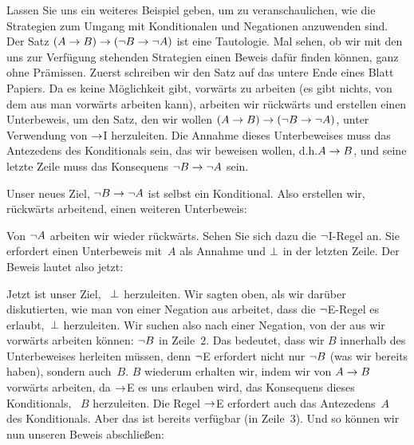 Lassen Sie uns ein weiteres Beispiel geben, um zu veranschaulichen, wie die Strategien zum Umgang mit Konditionalen und Negationen anzuwenden sind. Der Satz $(A \rightarrow B) \rightarrow (\neg B \rightarrow \neg A)$ ist eine Tautologie. Mal sehen, ob wir mit den uns zur Verfügung stehenden Strategien einen Beweis dafür finden können, ganz ohne Prämissen. Zuerst schreiben wir den Satz auf das untere Ende eines Blatt Papiers. Da es keine Möglichkeit gibt, vorwärts zu arbeiten (es gibt nichts, von dem aus man vorwärts arbeiten kann), arbeiten wir rückwärts und erstellen einen Unterbeweis, um den Satz, den wir wollen $(A \rightarrow B) \rightarrow (\neg B \rightarrow \neg A)$, unter Verwendung von $\rightarrow$I herzuleiten. Die Annahme dieses Unterbeweises muss das Antezedens des Konditionals sein, das wir beweisen wollen, d.h.\@ $A \rightarrow B$, und seine letzte Zeile muss das Konsequens $\neg B \rightarrow \neg A$ sein.
\begin{fitchproof}
\open
{}
\ellipsesline
{}
\close
{}
\end{fitchproof}
Unser neues Ziel, $\neg B \rightarrow \neg A$ ist selbst ein Konditional. Also erstellen wir, rückwärts arbeitend, einen weiteren Unterbeweis:
\begin{fitchproof}
	\open
	\open
	\ellipsesline
	\close
	\close
\end{fitchproof}
Von $\neg A$ arbeiten wir wieder rückwärts. Sehen Sie sich dazu die $\neg$I-Regel an. Sie erfordert einen Unterbeweis mit~$A$ als Annahme und $\bot$ in der letzten Zeile. Der Beweis lautet also jetzt:
\begin{fitchproof}
	\open
	\open
	\open{}
	\ellipsesline
	\close
	\close
	\close
\end{fitchproof}
Jetzt ist unser Ziel, ~$\bot$ herzuleiten. Wir sagten oben, als wir darüber diskutierten, wie man von einer Negation aus arbeitet, dass die $\neg$E-Regel es erlaubt,~$\bot$ herzuleiten. Wir suchen also nach einer Negation, von der aus wir vorwärts arbeiten können: $\neg B$ in Zeile~$2$. Das bedeutet, dass wir $B$ innerhalb des Unterbeweises herleiten müssen, denn $\neg$E erfordert nicht nur $\neg B$ (was wir bereits haben), sondern auch~$B$. $B$ wiederum erhalten wir, indem wir von $A \rightarrow B$ vorwärts arbeiten, da $\rightarrow$E es uns erlauben wird, das Konsequens dieses Konditionals, ~$B$ herzuleiten. Die Regel $\rightarrow$E erfordert auch das Antezedens~$A$ des Konditionals. Aber das ist bereits verfügbar (in Zeile~$3$). Und so können wir nun unseren Beweis abschlie{\ss}en:
\begin{fitchproof}
	\open
	\open
	\open{}
	\close
	\close
	\close
\end{fitchproof}

